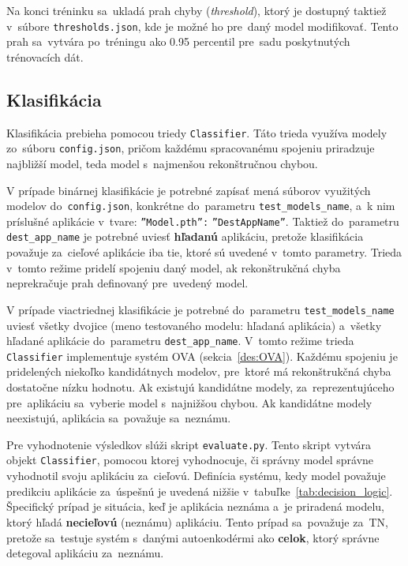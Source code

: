 Na konci tréninku sa~ukladá prah chyby (\textit{threshold}), ktorý je dostupný taktiež v~súbore \texttt{thresholds.json}, kde je možné ho pre~daný model modifikovať. Tento prah sa~vytvára po~tréningu ako 0.95 percentil pre~sadu poskytnutých trénovacích dát.

\subsection{Klasifikácia}\label{imp:classification}
Klasifikácia prebieha pomocou triedy \texttt{Classifier}. Táto trieda využíva modely zo~súboru \texttt{config.json}, pričom každému spracovanému spojeniu priradzuje najbližší model, teda model s~najmenšou rekonštručnou chybou. 

V prípade binárnej klasifikácie je potrebné zapísať mená súborov využitých modelov do~\texttt{config.json}, konkrétne do~parametru \texttt{test\_models\_name}, a~k nim príslušné aplikácie v~tvare: \texttt{''Model.pth'':} \texttt{''DestAppName''}. Taktiež do~parametru \texttt{dest\_app\_name} je potrebné uviesť \textbf{hľadanú} aplikáciu, pretože klasifikácia považuje za~cieľové aplikácie iba tie, ktoré sú uvedené v~tomto parametry. Trieda v~tomto režime pridelí spojeniu daný model, ak rekonštrukčná chyba neprekračuje prah definovaný pre~uvedený model.

V prípade viactriednej klasifikácie je potrebné do~parametru \texttt{test\_models\_name} uviesť všetky dvojice (meno testovaného modelu: hľadaná aplikácia) a~všetky hľadané aplikácie do~parametru \texttt{dest\_app\_name}. V~tomto režime trieda \texttt{Classifier} implementuje systém OVA (sekcia~\ref{des:OVA}). Každému spojeniu je pridelených niekoľko kandidátnych modelov, pre~ktoré má rekonštrukčná chyba dostatočne nízku hodnotu. Ak existujú kandidátne modely, za~reprezentujúceho pre~aplikáciu sa~vyberie model s~najnižšou chybou. Ak kandidátne modely neexistujú, aplikácia sa~považuje sa~neznámu.

Pre vyhodnotenie výsledkov slúži skript \texttt{evaluate.py}. Tento skript vytvára objekt \texttt{Classifier}, pomocou ktorej vyhodnocuje, či správny model správne vyhodnotil svoju aplikáciu za~cieľovú. Definícia systému, kedy model považuje predikciu aplikácie za~úspešnú je uvedená nižšie v~tabuľke~\ref{tab:decision_logic}. Špecifický prípad je situácia, keď je aplikácia neznáma a~je priradená modelu, ktorý hľadá \textbf{necieľovú} (neznámu) aplikáciu. Tento prípad sa~považuje za~TN, pretože sa~testuje systém s~danými autoenkodérmi ako \textbf{celok}, ktorý správne detegoval aplikáciu za~neznámu.

